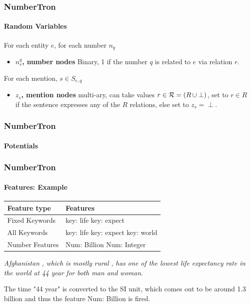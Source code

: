 \documentclass{beamer}
\begin{document}

\begin{frame}
\frametitle{NumberTron}
\framesubtitle{Random Variables}
For each entity $e$, for each number $n_q$
\begin{itemize}
\item \textbf{$n_r^q$, number nodes} Binary, 1 if the number $q$ is related to $e$ via relation $r$. 
\end{itemize}
\vspace{3em}
For each mention, $s \in S_{e,q}$
\begin{itemize}

\item \textbf{$z_s$, mention nodes} multi-ary, can take values $r \in {\cal R} = (R\, \cup \perp)$, set to $r \in R$ if the sentence expresses any of the $R$ relations, else set to $z_s = \perp$.
\end{itemize}
\end{frame}

\begin{frame}
\frametitle{NumberTron}
\framesubtitle{Potentials}
\end{frame}



\begin{frame}
\frametitle{NumberTron}
\framesubtitle{Features: Example}
\begin{table}
\begin{tabular}{|l|l|}
\hline
Feature type & Features \\
\hline
Fixed Keywords & key: life	key: expect \\
\hline
All Keywords & key: life	key: expect	key: world \\
\hline
Number Features & Num: Billion	Num: Integer \\
\hline
\end{tabular} \end{table}

{\color{red}\emph{Afghanistan , which is mostly rural , has one of the lowest life expectancy rate in the world at 44 year for both man and woman}}. 

The time "44 year" is converted to the SI unit, which comes out to be 
around 1.3 billion and thus the feature Num: Billion is fired.

\end{frame}
\end{document}
